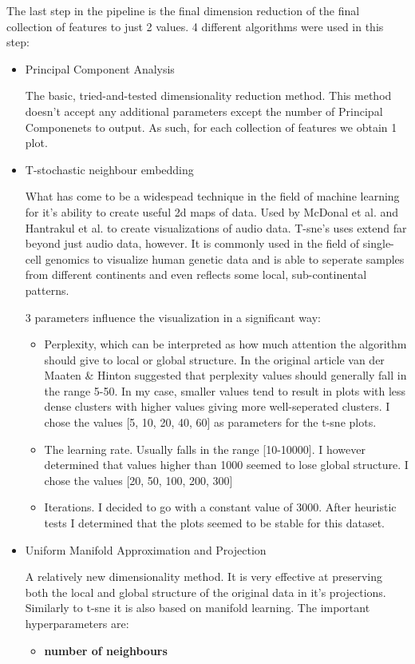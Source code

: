 \documentclass[11pt]{article}
\begin{document}
The last step in the pipeline is the final dimension reduction of the final collection of features to just 2 values. 4 different algorithms were used in this step:
\begin{itemize}
\item Principal Component Analysis

The basic, tried-and-tested dimensionality reduction method. This method doesn't accept any additional parameters except the number of Principal Componenets to output. As such, for each collection of features we obtain 1 plot.
\item T-stochastic neighbour embedding

What has come to be a widespead technique in the field of machine learning for it's ability to create useful 2d maps of data. Used by McDonal et al.  and Hantrakul et al. to create visualizations of audio data. T-sne's uses extend far beyond just audio data, however. It is commonly used in the field of single-cell genomics to visualize human genetic data \cite{doi:10.1142/S0219720017500172} and is able to seperate samples from different continents and even reflects some local, sub-continental patterns.

3 parameters influence the visualization in a significant way:
\begin{itemize}
\item Perplexity, which can be interpreted as how much attention the algorithm should give to local or global structure. In the original article van der Maaten \& Hinton suggested that perplexity values should generally fall in the range 5-50. In my case, smaller values tend to result in plots with less dense clusters with higher values giving more well-seperated clusters. I chose the values [5, 10, 20, 40, 60] as parameters for the t-sne plots.
\item The learning rate. Usually falls in the range [10-10000]. I however determined that values higher than 1000 seemed to lose global structure. I chose the values [20, 50, 100, 200, 300]
\item Iterations. I decided to go with a constant value of 3000. After heuristic tests I determined that the plots seemed to be stable for this dataset.
\end{itemize}

\item Uniform Manifold Approximation and Projection

A relatively new dimensionality method. It is very effective at preserving both the local and global structure of the original data in it's projections. Similarly to t-sne it is also based on manifold learning. The important hyperparameters are:
\begin{itemize}
\item \textbf{ number of neighbours }


\end{itemize}
\end{itemize}
\end{document}
